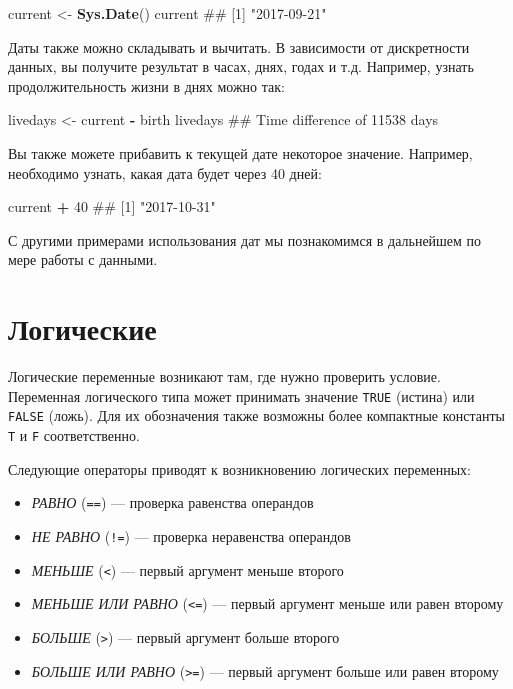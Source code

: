 \documentclass[]{book}
\newenvironment{Shaded}{\begin{snugshade}}{\end{snugshade}}
\newcommand{\KeywordTok}[1]{\textcolor[rgb]{0.13,0.29,0.53}{\textbf{#1}}}
\newcommand{\DecValTok}[1]{\textcolor[rgb]{0.00,0.00,0.81}{#1}}
\newcommand{\StringTok}[1]{\textcolor[rgb]{0.31,0.60,0.02}{#1}}
\newcommand{\OperatorTok}[1]{\textcolor[rgb]{0.81,0.36,0.00}{\textbf{#1}}}
\newcommand{\NormalTok}[1]{#1}
\providecommand{\tightlist}{%
  \setlength{\itemsep}{0pt}\setlength{\parskip}{0pt}}
\begin{document}
\begin{Shaded}
\begin{Highlighting}[]
\NormalTok{current <-}\StringTok{ }\KeywordTok{Sys.Date}\NormalTok{()}
\NormalTok{current}
\NormalTok{## [1] "2017-09-21"}
\end{Highlighting}
\end{Shaded}

Даты также можно складывать и вычитать. В зависимости от дискретности
данных, вы получите результат в часах, днях, годах и т.д. Например,
узнать продолжительность жизни в днях можно так:

\begin{Shaded}
\begin{Highlighting}[]
\NormalTok{livedays <-}\StringTok{ }\NormalTok{current }\OperatorTok{-}\StringTok{ }\NormalTok{birth}
\NormalTok{livedays}
\NormalTok{## Time difference of 11538 days}
\end{Highlighting}
\end{Shaded}

Вы также можете прибавить к текущей дате некоторое значение. Например,
необходимо узнать, какая дата будет через 40 дней:

\begin{Shaded}
\begin{Highlighting}[]
\NormalTok{current }\OperatorTok{+}\StringTok{ }\DecValTok{40}
\NormalTok{## [1] "2017-10-31"}
\end{Highlighting}
\end{Shaded}

С другими примерами использования дат мы познакомимся в дальнейшем по
мере работы с данными.

\section{Логические}\label{booleans}

Логические переменные возникают там, где нужно проверить условие.
Переменная логического типа может принимать значение \texttt{TRUE}
(истина) или \texttt{FALSE} (ложь). Для их обозначения также возможны
более компактные константы \texttt{T} и \texttt{F} соответственно.

Следующие операторы приводят к возникновению логических переменных:

\begin{itemize}
\tightlist
\item
  \emph{РАВНО} (\texttt{==}) --- проверка равенства операндов
\item
  \emph{НЕ РАВНО} (\texttt{!=}) --- проверка неравенства операндов
\item
  \emph{МЕНЬШЕ} (\texttt{\textless{}}) --- первый аргумент меньше
  второго
\item
  \emph{МЕНЬШЕ ИЛИ РАВНО} (\texttt{\textless{}=}) --- первый аргумент
  меньше или равен второму
\item
  \emph{БОЛЬШЕ} (\texttt{\textgreater{}}) --- первый аргумент больше
  второго
\item
  \emph{БОЛЬШЕ ИЛИ РАВНО} (\texttt{\textgreater{}=}) --- первый аргумент
  больше или равен второму
\end{itemize}
\end{document}
